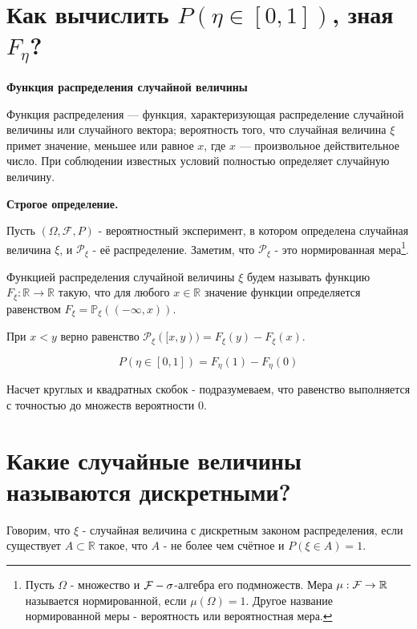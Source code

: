 \section{Как вычислить $P(\eta \in [0, 1])$, зная $F_{\eta}$?}

\noindent \textbf{Функция распределения случайной величины}

Функция распределения — функция, характеризующая распределение случайной величины или случайного вектора; вероятность того, что случайная величина $\xi$ примет значение, меньшее или равное $x$, где $x$ — произвольное действительное число. При соблюдении известных условий полностью определяет случайную величину.

\textbf{Строгое определение.}

\noindent Пусть $(\Omega, \mathcal{F}, P)$ - вероятностный эксперимент, в котором определена случайная величина $\xi$, и $\mathcal{P}_{\xi}$ - её распределение. Заметим, что $\mathcal{P}_{\xi}$ - это нормированная мера\footnote{Пусть $\Omega$ - множество и ${\mathcal F} - \sigma$-алгебра его подмножеств. Мера $\mu : {\mathcal F} \to \mathbb{R}$ называется нормированной, если $\mu (\Omega) = 1$. Другое название нормированной меры - вероятность или вероятностная мера.}.

Функцией распределения случайной величины $\xi$ будем называть функцию $F_{\xi}: \mathbb{R} \to \mathbb{R}$ такую, что для любого $x \in \mathbb{R}$ значение функции определяется равенством $F_{\xi} = \mathbb{P}_{\xi} ( (-\infty, x) )$.

\begin{remark}
	При $x < y$ верно равенство $\mathcal{P}_{\xi} ( [x, y) ) = F_{\xi} (y) - F_{\xi} (x)$.
\end{remark}

\[ P(\eta \in [0, 1]) = F_{\eta} (1) - F_{\eta} (0) \]

Насчет круглых и квадратных скобок - подразумеваем, что равенство выполняется с точностью до множеств вероятности 0.


\section{Какие случайные величины называются дискретными?}

Говорим, что $\xi$ - случайная величина с дискретным законом распределения, если существует $A \subset \mathbb{R}$ такое, что $A$ - не более чем счётное и $P(\xi \in A) = 1$.

